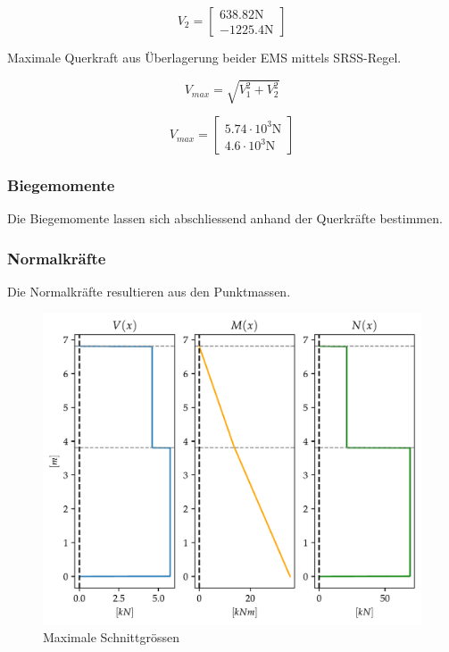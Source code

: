 \documentclass[
  letterpaper,
  DIV=11]{scrreprt}
\begin{document}
\begin{equation*}V_{2} = \left[\begin{matrix}638.82 \text{N}\\- 1225.4 \text{N}\end{matrix}\right]\end{equation*}

Maximale Querkraft aus Überlagerung beider EMS mittels SRSS-Regel.

\[
V_{max} = \sqrt{V_1^2 + V_2^2}
\]

\begin{equation*}V_{max} = \left[\begin{matrix}5.74 \cdot 10^{3} \text{N}\\4.6 \cdot 10^{3} \text{N}\end{matrix}\right]\end{equation*}

\hypertarget{biegemomente}{%
\subsubsection{Biegemomente}\label{biegemomente}}

Die Biegemomente lassen sich abschliessend anhand der Querkräfte
bestimmen.

\hypertarget{normalkruxe4fte}{%
\subsubsection{Normalkräfte}\label{normalkruxe4fte}}

Die Normalkräfte resultieren aus den Punktmassen.

\begin{figure}[H]

{\centering \includegraphics{index_files/mediabag/mms_06_files/figure-pdf/fig-schnittgroessen-output-1.pdf}

}

\caption{\label{fig-schnittgroessen}Maximale Schnittgrössen}

\end{figure}
\end{document}
